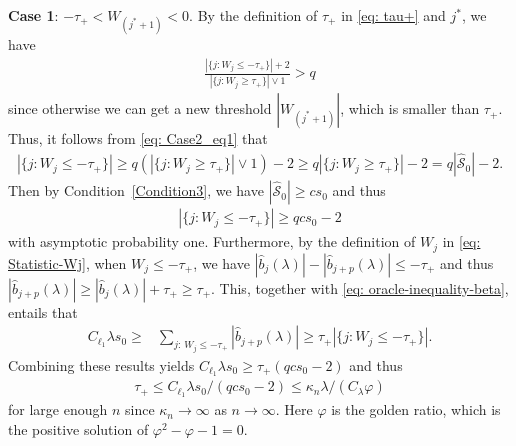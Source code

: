 \documentclass[11pt]{article}
\begin{document}
{\bf Case 1}: $-\tau_{+}< W_{(j^{*}+1)}< 0$. By the definition of $\tau_{+}$ in \eqref{eq: tau+} and $j^{*}$, we have 
\begin{align}\label{eq: Case2_eq1} 
\frac{|\{j: W_j \leq -\tau_{+}\}|+2}{|\{j: W_j \geq \tau_{+}\}|\vee 1}>q
\end{align}
since otherwise we can get a new threshold $|W_{(j^{*}+1)}|$, which is smaller than $\tau_{+}$. 
Thus, it follows from \eqref{eq: Case2_eq1} that 
\begin{align*} 
|\{j: W_j \leq -\tau_{+}\}|
\geq q(|\{j: W_j \geq \tau_{+}\}|\vee 1)-2
\geq q|\{j: W_j \geq \tau_{+}\}|-2
=q|\widehat{\mathcal{S}}_0|-2.
\end{align*}
Then by Condition~\ref{Condition3}, we have $|\widehat{\mathcal{S}}_0|\geq cs_0$ and thus 
\begin{align*} 
|\{j: W_j \leq -\tau_{+}\}|
\geq qcs_0-2
\end{align*}
with asymptotic probability one. Furthermore, by the definition of $W_j$ in \eqref{eq: Statistic-Wj}, when $W_j\leq -\tau_{+}$, we have $|\widehat{b}_j(\lambda)| - |\widehat{b}_{j+p}(\lambda)|\leq -\tau_{+}$ and thus $|\widehat{b}_{j+p}(\lambda)|\geq |\widehat{b}_j(\lambda)|+\tau_{+}\geq \tau_{+}$. This, together with \eqref{eq: oracle-inequality-beta}, entails that
\begin{align}\label{eq: A5}
C_{\ell_1}\lambda s_0
\geq & \sum_{j:\, W_j \leq -\tau_{+}}|\widehat{b}_{j+p}(\lambda)|
\geq \tau_{+}|\{j: W_j \leq -\tau_{+}\}|.
\end{align}
Combining these results yields $C_{\ell_1}\lambda s_0\geq \tau_{+}(qcs_0-2)$ and thus
\begin{align}\label{eq: tau+_bound}
\tau_{+}\leq 
C_{\ell_1}\lambda s_0/(qcs_0-2)\leq \kappa_n\lambda/(C_{\lambda}\varphi)
\end{align}
for large enough $n$ since $\kappa_n\to\infty$ as $n\to\infty$.  Here $\varphi$ is the golden ratio, which is the positive solution of $\varphi^2-\varphi-1=0$.%
\end{document}
